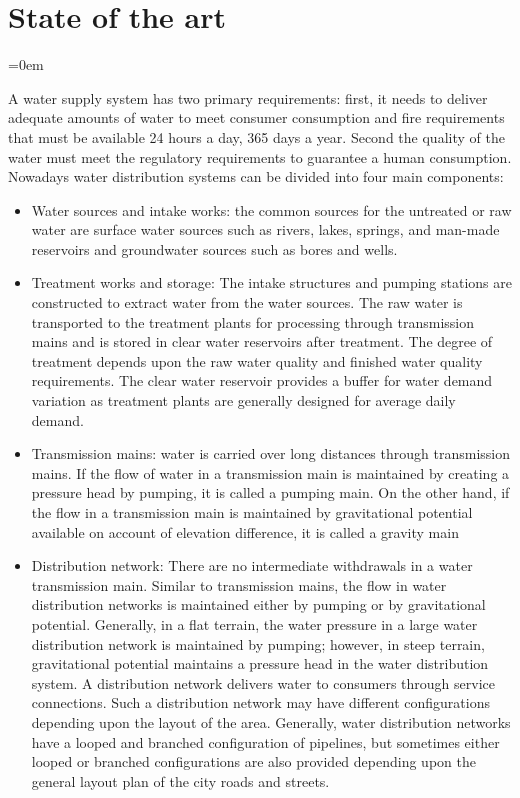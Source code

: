 ﻿\chapter{State of the art}
\label{capitolo2}
\thispagestyle{empty}
\parindent=0em



A water supply system has two primary requirements: first, it needs to deliver adequate amounts 
of water to meet consumer consumption and fire requirements that must be available 24 hours a 
day, 365 days a year. Second the quality of the water must meet the regulatory requirements to 
guarantee a human consumption. Nowadays water distribution systems can be divided into four main components: 
\begin{itemize}
    \item   Water sources and intake works: the common sources for the untreated or raw water are
     surface water sources such as rivers, lakes, springs, and man-made reservoirs and groundwater
      sources such as bores and wells.
    \item   Treatment works and storage: The intake structures and pumping stations are constructed 
    to extract water from the water sources. The raw water is transported to the treatment plants
     for processing through transmission mains and is stored in clear water reservoirs after 
     treatment. The degree of treatment depends upon the raw water quality and finished water 
     quality requirements. The clear water reservoir provides a buffer for water demand variation
      as treatment plants are generally designed for average daily demand.
    \item   Transmission mains: water is carried over long distances through transmission mains.
     If the flow of water in a transmission main is maintained by creating a pressure head by 
     pumping, it is called a pumping main. On the other hand, if the flow in a transmission main 
     is maintained by gravitational potential available on account of elevation difference, it is 
     called a gravity main
    \item   Distribution network: There are no intermediate withdrawals in a water transmission 
    main. Similar to transmission mains, the flow in water distribution networks is maintained 
    either by pumping or by gravitational potential. Generally, in a flat terrain, the water 
    pressure in a large water distribution network is maintained by pumping; however, in steep 
    terrain, gravitational potential maintains a pressure head in the water distribution system. 
    A distribution network delivers water to consumers through service connections. Such a 
    distribution network may have different configurations depending upon the layout of the area.
    Generally, water distribution networks have a looped and branched configuration of pipelines,
    but sometimes either looped or branched configurations are also provided depending upon the 
    general layout plan of the city roads and streets.
\end{itemize}

